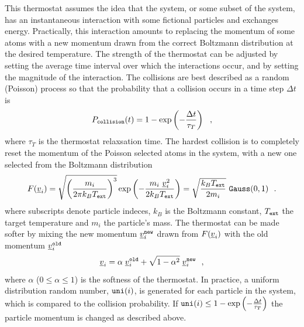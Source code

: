 This thermostat assumes the idea that the system, or some subset of
the system, has an instantaneous interaction with some fictional
particles and exchanges energy.  Practically, this interaction
amounts to replacing the momentum of some atoms with a new momentum
drawn from the correct Boltzmann distribution at the desired
temperature.  The strength of the thermostat can be adjusted by
setting the average time interval over which the interactions
occur, and by setting the magnitude of the interaction.  The
collisions are best described as a random (Poisson) process so that
the probability that a collision occurs
in a time step $\Delta t$ is
\begin{equation}
P_{\tt collision}(t) = 1 - \exp \left(-\frac{\Delta t}{\tau_{T}}\right)~~,
\end{equation}
where $\tau_{T}$ is the thermostat relaxsation time.  The hardest
collision is to completely reset the momentum of the Poisson
selected atoms in the system, with a new one selected from the
Boltzmann distribution
\begin{equation}
F(\mbox{$\underline{v}$}_{i}) = \sqrt{\left(\frac{m_{i}}{2 \pi k_{B}T_{\tt ext}}\right)^{3}}
\exp \left(-\frac{m_{i}~\mbox{$\underline{v}$}_{i}^{2}}{2 k_{B}T_{\tt ext}}\right) =
\sqrt{\frac{k_{B}T_{\tt ext}}{2 m_{i}}}~{\tt Gauss}(0,1)~~.
\end{equation}
where subscripts denote particle indeces, $k_{B}$ is the Boltzmann
constant, $T_{\tt ext}$ the target temperature and $m_{i}$ the particle's mass.
The thermostat can be made softer by mixing the new momentum
$\mbox{$\underline{v}$}_{i}^{\tt new}$ drawn from $F(\mbox{$\underline{v}$}_{i})$ with the old
momentum $\mbox{$\underline{v}$}_{i}^{\tt old}$
\begin{equation}
\mbox{$\underline{v}$}_{i} = \alpha \; \mbox{$\underline{v}$}_{i}^{\tt old} +
\sqrt{1-\alpha^{2}} \; \mbox{$\underline{v}$}_{i}^{\tt new}~~,
\end{equation}
where $\alpha$ ($0 \le \alpha \le 1$) is the softness of the
thermostat.  In practice, a uniform distribution random number,
${\tt uni}(i)$, is generated for each particle in the system,
which is compared to the collision probability.  If
${\tt uni}(i) \le 1 - \exp \left(-\frac{\Delta t}{\tau_{T}}\right)$
the particle momentum is changed as described above.

